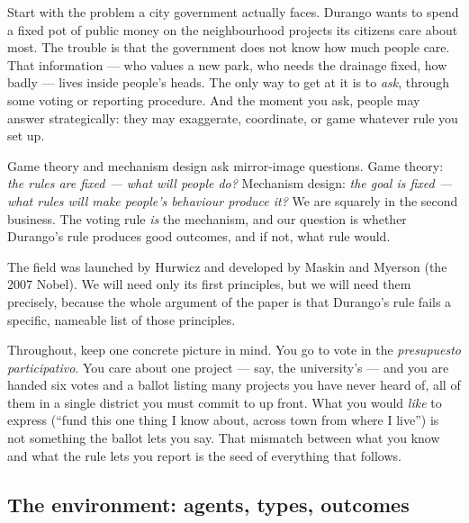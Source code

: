 \documentclass[11pt,letterpaper]{article}
\theoremstyle{definition}
\theoremstyle{plain}
\theoremstyle{remark}
\begin{document}
Start with the problem a city government actually faces. Durango wants to spend a fixed pot of
public money on the neighbourhood projects its citizens care about most. The trouble is that
the government does not know how much people care. That information --- who values a new park,
who needs the drainage fixed, how badly --- lives inside people's heads. The only way to get
at it is to \emph{ask}, through some voting or reporting procedure. And the moment you ask,
people may answer strategically: they may exaggerate, coordinate, or game whatever rule you
set up.

\begin{keyidea}
Game theory and mechanism design ask mirror-image questions.
Game theory: \emph{the rules are fixed --- what will people do?}
Mechanism design: \emph{the goal is fixed --- what rules will make people's behaviour produce it?}
We are squarely in the second business. The voting rule \emph{is} the mechanism, and our
question is whether Durango's rule produces good outcomes, and if not, what rule would.
\end{keyidea}

The field was launched by Hurwicz and developed by Maskin and Myerson (the 2007 Nobel). We
will need only its first principles, but we will need them precisely, because the whole
argument of the paper is that Durango's rule fails a specific, nameable list of those
principles.

\begin{connection}
Throughout, keep one concrete picture in mind. You go to vote in the \emph{presupuesto
participativo}. You care about one project --- say, the university's --- and you are handed six
votes and a ballot listing many projects you have never heard of, all of them in a single
district you must commit to up front. What you would \emph{like} to express (``fund this one
thing I know about, across town from where I live'') is not something the ballot lets you say.
That mismatch between what you know and what the rule lets you report is the seed of everything
that follows.
\end{connection}

\subsection{The environment: agents, types, outcomes}
\end{document}
